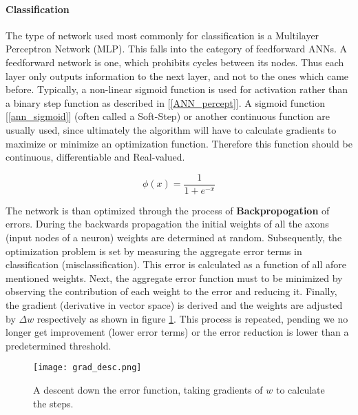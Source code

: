 	\paragraph{Classification}
		The type of network used most commonly for classification is a Multilayer Perceptron Network (MLP). This falls into the category of feedforward ANNs. A feedforward network is one, which prohibits cycles between its nodes. Thus each layer only outputs information to the next layer, and not to the ones which came before. Typically, a non-linear sigmoid function is used for activation rather than a binary step function as described in [\ref{ANN_percept}]. A sigmoid function [\ref{ann_sigmoid}] (often called a Soft-Step) or another continuous function are usually used, since ultimately the algorithm will have to calculate gradients to maximize or minimize an optimization function. Therefore this function should be continuous, differentiable and Real-valued.
		
		\begin{equation}
			\phi(x) = \frac{1}{1+ e^{-x}}
			\label{ann_sigmoid}
		\end{equation}
			
		\par
		
		The network is than optimized through the process of \textbf{Backpropogation} of errors. During the backwards propagation the initial weights of all the axons (input nodes of a neuron) weights are determined at random. Subsequently, the optimization problem is set by measuring the aggregate error terms in classification (misclassification). This error is calculated as a function of all afore mentioned weights. Next, the aggregate error function must to be minimized by observing the contribution of each weight to the error and reducing it. Finally, the gradient (derivative in vector space) is derived and the weights are adjusted by $ \Delta w $ respectively as shown in  figure \ref{ANN_backprop}. This process is repeated, pending we no longer get improvement (lower error terms) or the error reduction is lower than a predetermined threshold.
		
		\begin{figure}[h]
			\centering
			\captionsetup{width=0.8\textwidth}
			\texttt{[image: grad\_desc.png]}
			\caption[ANN Gradient Descent]{
				\footnotesize{
					A descent down the error function, taking gradients of $ w $ to calculate the steps.
				}
			} 
			\label{ANN_backprop}
		\end{figure}
	
